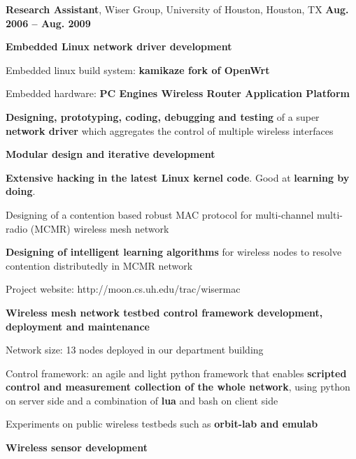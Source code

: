 \documentclass[overlapped, line]{resume}
\begin{document}
\begin{resume}
         {\bf Research Assistant}, Wiser Group, University of Houston, Houston, TX \hfill {\bf Aug. 2006 -- Aug. 2009}\\
         \vspace{-10pt}      %
         \begin{list2}
         \item \textbf{Embedded Linux network driver development}
           \begin{list2}
           \item Embedded linux build system: {\bf kamikaze fork of OpenWrt}
           \item Embedded hardware: {\bf PC Engines Wireless Router Application Platform}
           \item {\bf Designing, prototyping, coding, debugging and testing} of a super {\bf network driver} which aggregates the control of multiple wireless interfaces
           \item {\bf Modular design and iterative development}
           \item {\bf Extensive hacking in the latest Linux kernel code}. Good at {\bf learning by doing}.
           \item Designing of a contention based robust MAC protocol for multi-channel multi-radio (MCMR) wireless mesh network
           \item {\bf Designing of intelligent learning algorithms} for wireless nodes to resolve contention distributedly in MCMR network
           \item Project website: http://moon.cs.uh.edu/trac/wisermac
           \end{list2}
         \item \textbf{Wireless mesh network testbed control framework development, deployment and maintenance}
           \begin{list2}
           \item Network size: 13 nodes deployed in our department building
           \item Control framework: an agile and light python framework that enables {\bf scripted control and measurement collection of the whole network}, using python on server side and a combination of {\bf lua} and bash on client side
           \item Experiments on public wireless testbeds such as {\bf orbit-lab and emulab}
           \end{list2}
         \item \textbf{Wireless sensor development}

\end{list2}
\end{resume}
\end{document}
